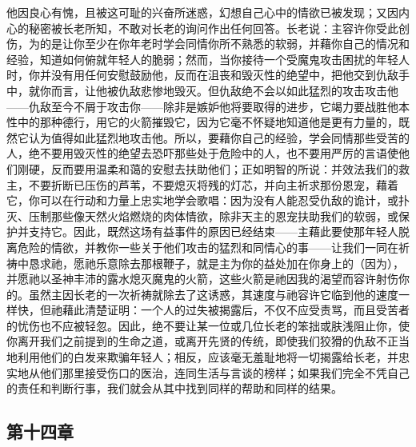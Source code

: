 他因良心有愧，且被这可耻的兴奋所迷惑，幻想自己心中的情欲已被发现；又因内心的秘密被长老所知，不敢对长老的询问作出任何回答。长老说：主容许你受此创伤，为的是让你至少在你年老时学会同情你所不熟悉的软弱，并藉你自己的情况和经验，知道如何俯就年轻人的脆弱；然而，当你接待一个受魔鬼攻击困扰的年轻人时，你并没有用任何安慰鼓励他，反而在沮丧和毁灭性的绝望中，把他交到仇敌手中，就你而言，让他被仇敌悲惨地毁灭。但仇敌绝不会以如此猛烈的攻击攻击他——仇敌至今不屑于攻击你——除非是嫉妒他将要取得的进步，它竭力要战胜他本性中的那种德行，用它的火箭摧毁它，因为它毫不怀疑地知道他是更有力量的，既然它认为值得如此猛烈地攻击他。所以，要藉你自己的经验，学会同情那些受苦的人，绝不要用毁灭性的绝望去恐吓那些处于危险中的人，也不要用严厉的言语使他们刚硬，反而要用温柔和蔼的安慰去扶助他们；正如明智的所说：并效法我们的救主，不要折断已压伤的芦苇，不要熄灭将残的灯芯，并向主祈求那份恩宠，藉着它，你可以在行动和力量上忠实地学会歌唱：因为没有人能忍受仇敌的诡计，或扑灭、压制那些像天然火焰燃烧的肉体情欲，除非天主的恩宠扶助我们的软弱，或保护并支持它。因此，既然这场有益事件的原因已经结束——主藉此要使那年轻人脱离危险的情欲，并教你一些关于他们攻击的猛烈和同情心的事——让我们一同在祈祷中恳求祂，愿祂乐意除去那根鞭子，就是主为你的益处加在你身上的（因为），并愿祂以圣神丰沛的露水熄灭魔鬼的火箭，这些火箭是祂因我的渴望而容许射伤你的。虽然主因长老的一次祈祷就除去了这诱惑，其速度与祂容许它临到他的速度一样快，但祂藉此清楚证明：一个人的过失被揭露后，不仅不应受责骂，而且受苦者的忧伤也不应被轻忽。因此，绝不要让某一位或几位长老的笨拙或肤浅阻止你，使你离开我们之前提到的生命之道，或离开先贤的传统，即使我们狡猾的仇敌不正当地利用他们的白发来欺骗年轻人；相反，应该毫无羞耻地将一切揭露给长老，并忠实地从他们那里接受伤口的医治，连同生活与言谈的榜样；如果我们完全不凭自己的责任和判断行事，我们就会从其中找到同样的帮助和同样的结果。\par


\subsection{第十四章}

